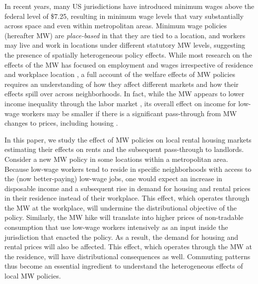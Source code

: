 

In recent years, many US jurisdictions have introduced minimum wages above the 
federal level of \$7.25, resulting in minimum wage levels that vary 
substantially across space and even within metropolitan areas.
Minimum wage policies (hereafter MW) are \textit{place-based} in that they are 
tied to a location, and workers may live and work in locations under different 
statutory MW levels, suggesting the presence of spatially heterogeneous policy 
effects.
While most research on the effects of the MW has focused on employment and 
wages irrespective of residence and workplace location
\parencite[e.g.,][]{CardKrueger1994, CegnizEtAl2019},
a full account of the welfare effects of MW policies requires an understanding 
of how they affect different markets and how their effects spill over across 
neighborhoods.
In fact, while the MW appears to lower income inequality through the labor 
market \parencite{Lee1999, AutorEtAl2016},
its overall effect on income for low-wage workers may be smaller if there is 
a significant pass-through from MW changes to prices, including housing
\parencite{Macurdy2015}.

In this paper, we study the effect of MW policies on local rental housing 
markets estimating their effects on rents and the subsequent pass-through
to landlords.
Consider a new MW policy in some locations within a metropolitan area.
Because low-wage workers tend to reside in specific neighborhoods with access 
to the (now better-paying) low-wage jobs,
one would expect an increase in disposable income and a subsequent rise in demand 
for housing and rental prices in their residence instead of their workplace.
This effect, which operates through the MW at the workplace, 
will undermine the distributional objective of the policy.
Similarly, the MW hike will translate into higher prices of non-tradable 
consumption that use low-wage workers intensively as an input inside the 
jurisdiction that enacted the policy.
As a result, the demand for housing and rental prices will also be affected.
This effect, which operates through the MW at the residence, will have 
distributional consequences as well.
Commuting patterns thus become an essential ingredient to understand the 
heterogeneous effects of local MW policies.

